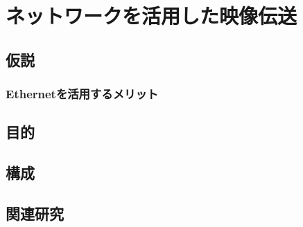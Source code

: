 \chapter{ネットワークを活用した映像伝送}
\label{chap:network-transmission}
\section{仮説}
\subsection{Ethernetを活用するメリット}
\section{目的}
\section{構成}
\section{関連研究}

